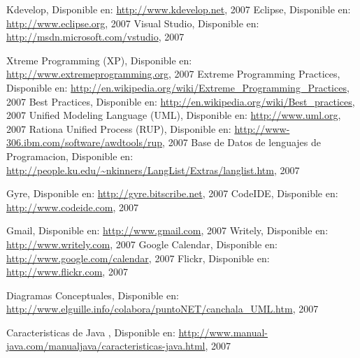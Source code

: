 \begin{thebibliography}{99}
 Kdevelop, Disponible en: \url{http://www.kdevelop.net}, 2007
 Eclipse, Disponible en: \url{http://www.eclipse.org}, 2007
 Visual Studio, Disponible en: \url{http://msdn.microsoft.com/vstudio}, 2007

 Xtreme Programming (XP), Disponible en: \url{http://www.extremeprogramming.org}, 2007
 Extreme Programming Practices, Disponible en:
	\url{http://en.wikipedia.org/wiki/Extreme_Programming_Practices}, 2007
 Best Practices, Disponible en:
	\url{http://en.wikipedia.org/wiki/Best_practices}, 2007
 Unified Modeling Language (UML), Disponible en: \url{http://www.uml.org}, 2007
 Rationa Unified Process (RUP), Disponible en: \url{http://www-306.ibm.com/software/awdtools/rup}, 2007
 Base de Datos de lenguajes de Programacion, Disponible en:
	\url{http://people.ku.edu/~nkinners/LangList/Extras/langlist.htm}, 2007

 Gyre, Disponible en: \url{http://gyre.bitscribe.net}, 2007
 CodeIDE, Disponible en: \url{http://www.codeide.com}, 2007

 Gmail, Disponible en: \url{http://www.gmail.com}, 2007
 Writely, Disponible en: \url{http://www.writely.com}, 2007
 Google Calendar, Disponible en: \url{http://www.google.com/calendar}, 2007
 Flickr, Disponible en: \url{http://www.flickr.com}, 2007

 Diagramas Conceptuales, Disponible en: \url{http://www.elguille.info/colabora/puntoNET/canchala_UML.htm}, 2007


Caracteristicas de Java , Disponible en:
\url{http://www.manual-java.com/manualjava/caracteristicas-java.html}, 2007

\end{thebibliography}
